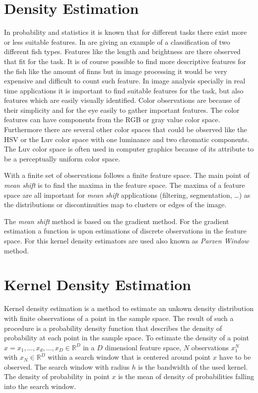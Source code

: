 \section{Density Estimation} %
\label{sec:density_estimation}
In probability and statistics it is known that for different tasks there exist
more or less suitable features. In \citeauthor{citeulike:167581}
\citep{citeulike:167581} are giving an example of a classification of two
different fish types. Features like the length and brightness are there observed
that fit for the task. It is of course possible to find more descriptive
features for the fish like the amount of finns but in image processing it would
be very expensive and difficult to count such feature. In image analysis
specially in real time applications it is important to find suitable features
for the task, but also features which are easily visually identified. Color
observations are because of their simplicity and for the eye easily to gather
important features. The color features can have components from the \gls{RGB} or
gray value color space. Furthermore there are several other color spaces that
could be observed like the \gls{HSV} or the \gls{Luv} color space with one
luminance and two chromatic components. The \gls{Luv} color space is often used
in computer graphics because of its attribute to be a perceptually uniform color
space.

With a finite set of observations follows a finite feature space. The main point
of \emph{mean shift} is to find the maxima in the feature space. The maxima of a
feature space are all important for \emph{mean shift} applications
(filtering, segmentation, \ldots) as the distributions or discontinuities map to
clusters or edges of the image.

The \emph{mean shift} method is based on the gradient method. For the gradient
estimation a function is upon estimations of discrete observations in the
feature space. For this kernel density estimators are used also known as 
\emph{Parzen Window} method.


\section{Kernel Density Estimation} %
\label{sec:kernel_density_estimation}
Kernel density estimation is a method to estimate an unkown density
distribution with finite observations of a point in the sample space. 
The result of such a procedure is a probability density function that describes 
the density of probability at each point in the sample space. To estimate the 
density of a point $x = { x_1, \ldots , x_d, \ldots , x_D} \in \mathbb{R}^D$ in a 
$D$ dimensionl feature space, $N$ observations $x_1^N$ with
 $x_N \in \mathbb{R}^D$ within a search window that is centered around point $x$
have to be observed. The search window with radius $h$ is the bandwidth of the
used kernel. The density of probability in point $x$ is the mean of density of
{\color{iRed}probabilities falling into the search window.}

